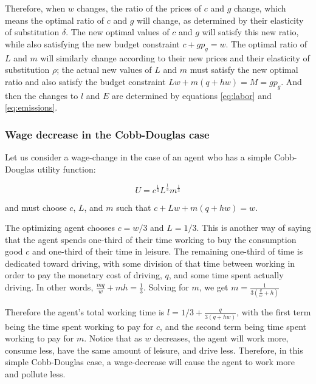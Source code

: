 \documentclass[letter, 12pt, epsf,leqno]{article}
\begin{document}
Therefore, when $w$ changes, the ratio of the prices of $c$ and $g$ change, which means the optimal ratio of $c$ and $g$ will change, as determined by their elasticity of substitution $\delta$.  The new optimal values of $c$ and $g$ will satisfy this new ratio, while also satisfying the new budget constraint $c+gp_g=w$.  The optimal ratio of $L$ and $m$ will similarly change according to their new prices and their elasticity of substitution $\rho$; the actual new values of $L$ and $m$ must satisfy the new optimal ratio and also satisfy the budget constraint $Lw+m(q+hw)=M=gp_g$.  And then the changes to $l$ and $E$ are determined by equations \ref{eq:labor} and \ref{eq:emissions}.


\subsubsection{Wage decrease in the Cobb-Douglas case}

Let us consider a wage-change in the case of an agent who has a simple Cobb-Douglas utility function:

\begin{equation}U=c^\frac{1}{3}L^\frac{1}{3}m^\frac{1}{3}\end{equation}

and must choose $c$, $L$, and $m$ such that $c+Lw+m(q+hw)=w$.

The optimizing agent chooses $c=w/3$ and $L=1/3$.  This is another way of saying that the agent spends one-third of their time working to buy the consumption good $c$ and one-third of their time in leisure.  The remaining one-third of time is dedicated toward driving, with some division of that time between working in order to pay the monetary cost of driving, $q$, and some time spent actually driving.  In other words, $\frac{mq}{w}+mh = \frac{1}{3}$.  Solving for $m$, we get $m=\frac{1}{3(\frac{q}{w}+h)}$

Therefore the agent's total working time is $l=1/3 + \frac{q}{3(q+hw)}$, with the first term being the time spent working to pay for $c$, and the second term being time spent working to pay for $m$.  Notice that as $w$ decreases, the agent will work more, consume less, have the same amount of leisure, and drive less.  Therefore, in this simple Cobb-Douglas case, a wage-decrease will cause the agent to work more and pollute less.
\end{document}
